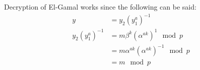 

Decryption of El-Gamal works since the following can be said:
\begin{align*}
  y &= y_2(y_1^a)^{-1}\\
  y_2(y_1^a)^{-1} &= m\beta^k(\alpha^{ak})^{1} \mod p\\
  &= m\alpha^{ak}(\alpha^{ak})^{-1} \mod p\\
  &= m \mod p
\end{align*}
